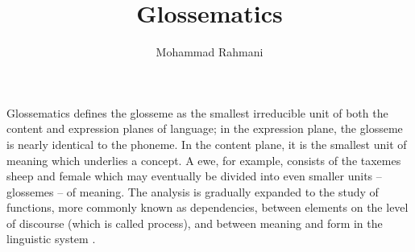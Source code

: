 \documentclass[a4paper]{article}
\title{Glossematics}
\date{}
\author{Mohammad Rahmani}
\begin{document}
\maketitle
    Glossematics defines the glosseme as the smallest irreducible unit of both the content and expression planes of language; in the expression plane, the glosseme is nearly identical to the phoneme. In the content plane, it is the smallest unit of meaning which underlies a concept. A ewe, for example, consists of the taxemes sheep and female which may eventually be divided into even smaller units – glossemes – of meaning. The analysis is gradually expanded to the study of functions, more commonly known as dependencies, between elements on the level of discourse (which is called process), and between meaning and form in the linguistic system  .
    
    
\end{document}
